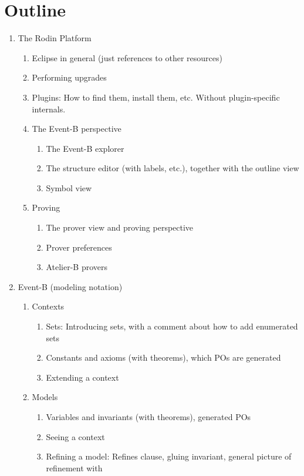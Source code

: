 
\section{Outline}

\begin{enumerate}
\item The Rodin Platform
  \begin{enumerate}
  \item Eclipse in general (just references to other resources)
  \item Performing upgrades
  \item Plugins: How to find them, install them, etc. Without plugin-specific internals.
  \item The Event-B perspective
    \begin{enumerate}
    \item The Event-B explorer
    \item The structure editor (with labels, etc.), together with the outline view
    \item Symbol view
    \end{enumerate}
  \item Proving
    \begin{enumerate}
    \item The prover view and proving perspective
    \item Prover preferences
    \item Atelier-B provers
    \end{enumerate}
  \end{enumerate}
\item Event-B (modeling notation)
  \begin{enumerate}
  \item Contexts
    \begin{enumerate}
    \item Sets: Introducing sets, with a comment about how to add enumerated sets
    \item Constants and axioms (with theorems), which POs are generated
    \item Extending a context
    \end{enumerate}
  \item Models
    \begin{enumerate}
    \item Variables and invariants (with theorems), generated POs 
    \item Seeing a context
    \item Refining a model: Refines clause, gluing invariant, general picture of refinement with

\end{enumerate}
\end{enumerate}
\end{enumerate}
